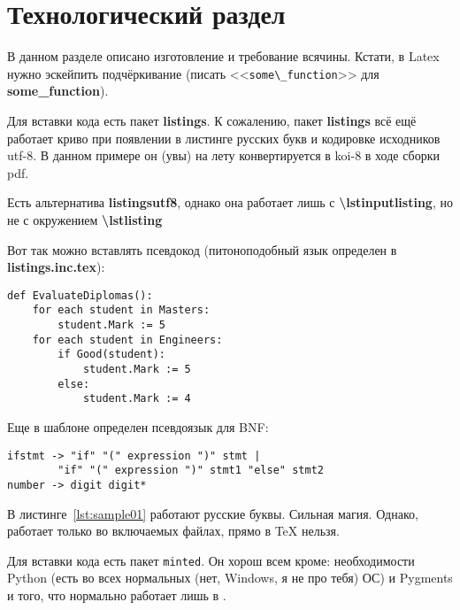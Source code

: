 \chapter{Технологический раздел}
\label{cha:impl}

В данном разделе описано изготовление и требование всячины. Кстати,
в Latex нужно эскейпить подчёркивание (писать <<\verb|some\_function|>> для \textbf{some\_function}).

\ifPDFTeX
    Для вставки кода есть пакет \textbf{listings}. К сожалению, пакет \textbf{listings} всё ещё
    работает криво при появлении в листинге русских букв и кодировке исходников utf-8.
    В данном примере он (увы) на лету конвертируется в koi-8 в ходе сборки pdf.

    Есть альтернатива \textbf{listingsutf8}, однако она работает лишь с
    \textbf{\textbackslash{}lstinputlisting}, но не с окружением \textbf{\textbackslash{}lstlisting}

    Вот так можно вставлять псевдокод (питоноподобный язык определен в \textbf{listings.inc.tex}):

    \begin{lstlisting}[style=pseudocode,caption={Алгоритм оценки дипломных работ}]
def EvaluateDiplomas():
    for each student in Masters:
        student.Mark := 5
    for each student in Engineers:
        if Good(student):
            student.Mark := 5
        else:
            student.Mark := 4
    \end{lstlisting}

    Еще в шаблоне определен псевдоязык для BNF:

    \begin{lstlisting}[style=grammar,basicstyle=\small,caption={Грамматика}]
ifstmt -> "if" "(" expression ")" stmt |
        "if" "(" expression ")" stmt1 "else" stmt2
number -> digit digit*
    \end{lstlisting}

    В листинге~\ref{lst:sample01} работают русские буквы. Сильная магия. Однако, работает
    только во включаемых файлах, прямо в \TeX{} нельзя.

    

    

\else

    Для вставки кода есть пакет \texttt{minted}. Он хорош всем кроме: необходимости
    Python (есть во всех нормальных (нет, Windows, я не про тебя) ОС) и Pygments и
    того, что нормально работает лишь в \XeLaTeX.

